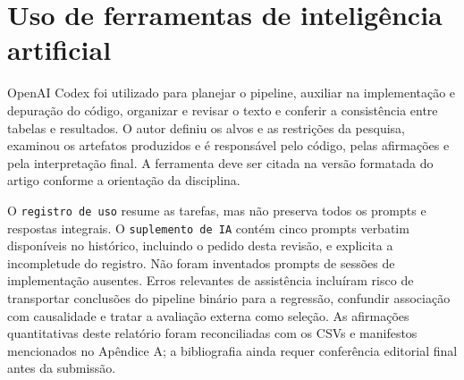 \section{Uso de ferramentas de inteligência
artificial}\label{uso-de-ferramentas-de-inteliguxeancia-artificial}

OpenAI Codex \cite{openai_codex} foi utilizado para planejar o pipeline, auxiliar na
implementação e depuração do código, organizar e revisar o texto e
conferir a consistência entre tabelas e resultados. O autor definiu os
alvos e as restrições da pesquisa, examinou os artefatos produzidos e é
responsável pelo código, pelas afirmações e pela interpretação final. A
ferramenta deve ser citada na versão formatada do artigo conforme a
orientação da disciplina.

O \texttt{registro\ de\ uso} resume as tarefas, mas não preserva todos
os prompts e respostas integrais. O \texttt{suplemento\ de\ IA} contém
cinco prompts verbatim disponíveis no histórico, incluindo o pedido
desta revisão, e explicita a incompletude do registro. Não foram
inventados prompts de sessões de implementação ausentes. Erros
relevantes de assistência incluíram risco de transportar conclusões do
pipeline binário para a regressão, confundir associação com causalidade
e tratar a avaliação externa como seleção. As afirmações quantitativas
deste relatório foram reconciliadas com os CSVs e manifestos mencionados
no Apêndice A; a bibliografia ainda requer conferência editorial final
antes da submissão.
